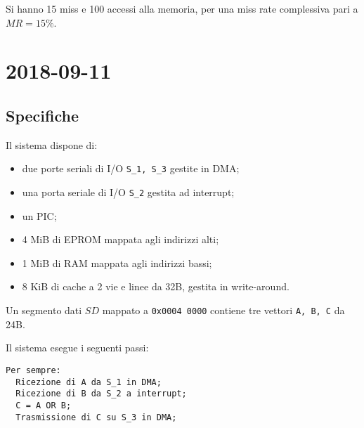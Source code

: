 \documentclass[a4paper]{article}
\begin{document}
Si hanno 15 miss e 100 accessi alla memoria, per una miss rate complessiva pari a $MR = 15\%$.

\section{2018-09-11}

\subsection{Specifiche}
Il sistema dispone di:

\begin{itemize}
\item due porte seriali di I/O \texttt{S\_1, S\_3} gestite in DMA;
\item una porta seriale di I/O \texttt{S\_2} gestita ad interrupt;
\item un PIC;
\item 4 MiB di EPROM mappata agli indirizzi alti;
\item 1 MiB di RAM mappata agli indirizzi bassi;
\item 8 KiB di cache a 2 vie e linee da 32B, gestita in write-around.
\end{itemize}

Un segmento dati $SD$ mappato a \texttt{0x0004 0000} contiene tre vettori \texttt{A, B, C} da 24B.

Il sistema esegue i seguenti passi:
\begin{verbatim}
Per sempre:
  Ricezione di A da S_1 in DMA;
  Ricezione di B da S_2 a interrupt;
  C = A OR B;
  Trasmissione di C su S_3 in DMA;
\end{verbatim}
\end{document}
